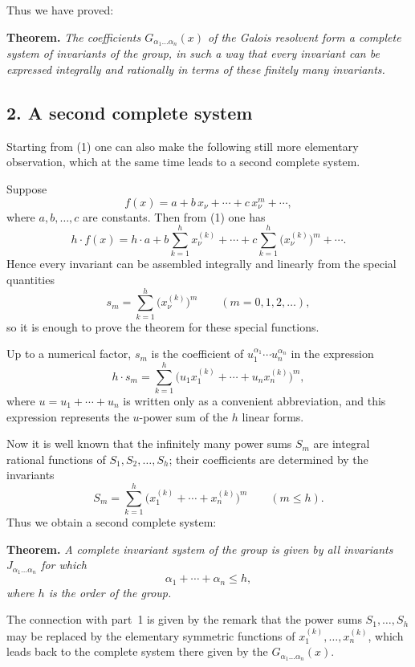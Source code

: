 \documentclass[11pt]{article}
\begin{document}
Thus we have proved:

\medskip
\noindent
\textbf{Theorem.}
\emph{The coefficients $G_{\alpha_1\dots\alpha_n}(x)$ of the Galois resolvent form a complete system of invariants of the group, in such a way that every invariant can be expressed integrally and rationally in terms of these finitely many invariants.}

\subsection*{2. A second complete system}

Starting from \textup{(1)} one can also make the following still more elementary observation, which at the same time leads to a second complete system.

Suppose
\[
f(x)=a+b\,x_\nu+\cdots+c\,x_\nu^m+\cdots,
\]
where $a,b,\dots,c$ are constants. Then from \textup{(1)} one has
\[
h\cdot f(x)
 = h\cdot a
   + b\sum_{k=1}^h x^{(k)}_\nu
   + \cdots
   + c\sum_{k=1}^h \bigl(x^{(k)}_\nu\bigr)^m
   + \cdots.
\]
Hence every invariant can be assembled integrally and linearly from the special quantities
\[
s_m=\sum_{k=1}^h \bigl(x^{(k)}_\nu\bigr)^m
\qquad (m=0,1,2,\dots),
\]
so it is enough to prove the theorem for these special functions.

Up to a numerical factor, $s_m$ is the coefficient of $u_1^{\alpha_1}\cdots u_n^{\alpha_n}$ in the expression
\[
h\cdot s_m=\sum_{k=1}^h\bigl(u_1x^{(k)}_1+\cdots+u_nx^{(k)}_n\bigr)^m,
\]
where $u=u_1+\cdots+u_n$ is written only as a convenient abbreviation, and this expression represents the $u$-power sum of the $h$ linear forms.

Now it is well known that the infinitely many power sums $S_m$ are integral rational functions of $S_1,S_2,\dots,S_h$; their coefficients are determined by the invariants
\[
S_m=\sum_{k=1}^h\bigl(x^{(k)}_1+\cdots+x^{(k)}_n\bigr)^m
\qquad (m\le h).
\]
Thus we obtain a second complete system:

\medskip
\noindent
\textbf{Theorem.}
\emph{A complete invariant system of the group is given by all invariants $J_{\alpha_1\dots\alpha_n}$ for which}
\[
\alpha_1+\cdots+\alpha_n\le h,
\]
\emph{where $h$ is the order of the group.}

The connection with part~1 is given by the remark that the power sums $S_1,\dots,S_h$ may be replaced by the elementary symmetric functions of $x^{(k)}_1,\dots,x^{(k)}_n$, which leads back to the complete system there given by the $G_{\alpha_1\dots\alpha_n}(x)$.
\end{document}
